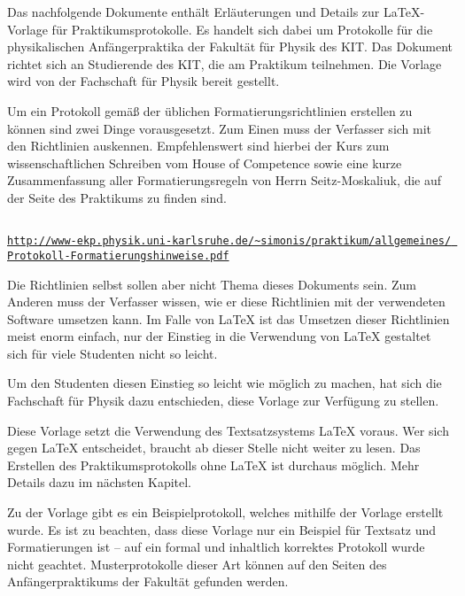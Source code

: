 Das nachfolgende Dokumente enthält Erläuterungen und Details zur LaTeX-Vorlage 
für Praktikumsprotokolle. Es handelt sich dabei um Protokolle für die 
physikalischen Anfängerpraktika der Fakultät für Physik des KIT. Das Dokument 
richtet sich an Studierende des KIT, die am Praktikum teilnehmen. Die Vorlage 
wird von der Fachschaft für Physik bereit gestellt.

Um ein Protokoll gemäß der üblichen Formatierungsrichtlinien erstellen zu 
können sind zwei Dinge vorausgesetzt. Zum Einen muss der Verfasser sich mit den 
Richtlinien auskennen. Empfehlenswert sind hierbei der Kurs zum 
wissenschaftlichen Schreiben vom House of Competence sowie eine kurze 
Zusammenfassung aller Formatierungsregeln von Herrn Seitz-Moskaliuk, die auf 
der Seite des Praktikums zu finden sind.

\hfill\href{
http://www-ekp.physik.uni-karlsruhe.de/~simonis/praktikum/allgemeines/Protokoll-
Formatierungshinweise.pdf}{\nolinkurl{
http://www-ekp.physik.uni-karlsruhe.de/~simonis/praktikum/allgemeines/ 
Protokoll-Formatierungshinweise.pdf}}

Die Richtlinien selbst sollen aber nicht Thema dieses Dokuments sein. Zum 
Anderen muss der Verfasser wissen, wie er diese Richtlinien mit der verwendeten 
Software umsetzen kann. Im Falle von LaTeX ist das Umsetzen dieser Richtlinien 
meist enorm einfach, nur der Einstieg in die Verwendung von LaTeX gestaltet 
sich für viele Studenten nicht so leicht.

Um den Studenten diesen Einstieg so leicht wie möglich zu machen, hat sich die 
Fachschaft für Physik dazu entschieden, diese Vorlage zur Verfügung zu stellen.

Diese Vorlage setzt die Verwendung des Textsatzsystems LaTeX voraus. Wer sich 
gegen LaTeX entscheidet, braucht ab dieser Stelle nicht weiter zu lesen. Das 
Erstellen des Praktikumsprotokolls ohne LaTeX ist durchaus möglich. Mehr Details 
dazu im nächsten Kapitel.

Zu der Vorlage gibt es ein Beispielprotokoll, welches mithilfe der Vorlage 
erstellt wurde. Es ist zu beachten, dass diese Vorlage nur ein Beispiel für 
Textsatz und Formatierungen ist – auf ein formal und inhaltlich korrektes 
Protokoll wurde nicht geachtet. Musterprotokolle dieser Art können auf den 
Seiten des Anfängerpraktikums der Fakultät gefunden werden.
